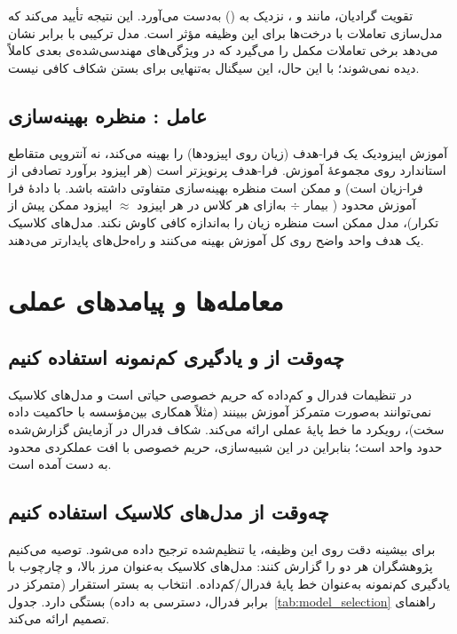 تقویت گرادیان، مانند  و ،  نزدیک به  () به‌دست می‌آورد. این نتیجه تأیید می‌کند که مدل‌سازی تعاملات با درخت‌ها برای این وظیفه مؤثر است. مدل ترکیبی با  برابر  نشان می‌دهد  برخی تعاملات مکمل را می‌گیرد که در ویژگی‌های مهندسی‌شده‌ی بعدی کاملاً دیده نمی‌شوند؛ با این حال، این سیگنال به‌تنهایی برای بستن شکاف کافی نیست.

\subsection{عامل : منظره بهینه‌سازی}

آموزش اپیزودیک یک فرا-هدف (زیان روی اپیزودها) را بهینه می‌کند، نه آنتروپی متقاطع استاندارد روی مجموعۀ آموزش. فرا-هدف پرنویزتر است (هر اپیزود برآورد تصادفی از فرا-زیان است) و ممکن است منظره بهینه‌سازی متفاوتی داشته باشد. با دادۀ فرا آموزش محدود ( بیمار $\div$  به‌ازای هر کلاس در هر اپیزود $\approx$  اپیزود ممکن پیش از تکرار)، مدل ممکن است منظره زیان را به‌اندازه کافی کاوش نکند. مدل‌های کلاسیک یک هدف واحد واضح روی کل آموزش بهینه می‌کنند و راه‌حل‌های پایدارتر می‌دهند.

\section{معامله‌ها و پیامدهای عملی}

\subsection{\texorpdfstring{چه‌وقت از  و یادگیری کم‌نمونه استفاده کنیم}{چه‌وقت از ETHOS و یادگیری کم‌نمونه استفاده کنیم}}

در تنظیمات فدرال و کم‌داده که حریم خصوصی حیاتی است و مدل‌های کلاسیک نمی‌توانند به‌صورت متمرکز آموزش ببینند (مثلاً همکاری بین‌مؤسسه با حاکمیت داده سخت)، رویکرد ما خط پایۀ عملی ارائه می‌کند. شکاف فدرال در آزمایش گزارش‌شده حدود  واحد  است؛ بنابراین در این شبیه‌سازی، حریم خصوصی با افت عملکردی محدود به دست آمده است.

\subsection{چه‌وقت از مدل‌های کلاسیک استفاده کنیم}

برای بیشینه دقت روی این وظیفه،  یا  تنظیم‌شده ترجیح داده می‌شود. توصیه می‌کنیم پژوهشگران هر دو را گزارش کنند: مدل‌های کلاسیک به‌عنوان مرز بالا، و چارچوب  با یادگیری کم‌نمونه به‌عنوان خط پایۀ فدرال/کم‌داده. انتخاب به بستر استقرار (متمرکز در برابر فدرال، دسترسی به داده) بستگی دارد. جدول~\ref{tab:model_selection} راهنمای تصمیم ارائه می‌کند.

